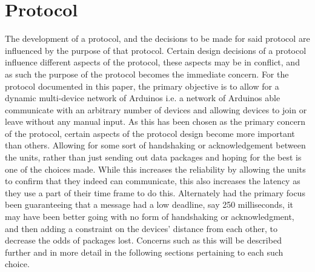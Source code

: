 \section{Protocol}
The development of a protocol, and the decisions to be made for said protocol are influenced by the purpose of that protocol.
Certain design decisions of a protocol influence different aspects of the protocol, these aspects may be in conflict, and as such the purpose of the protocol becomes the immediate concern.
For the protocol documented in this paper, the primary objective is to allow for a dynamic multi-device network of Arduinos i.e. a network of Arduinos able communicate with an arbitrary number of devices and allowing devices to join or leave without any manual input.
As this has been chosen as the primary concern of the protocol, certain aspects of the protocol design become more important than others.
Allowing for some sort of handshaking or acknowledgement between the units, rather than just sending out data packages and hoping for the best is one of the choices made.
While this increases the reliability by allowing the units to confirm that they indeed can communicate, this also increases the latency as they use a part of their time frame to do this.
Alternately had the primary focus been guaranteeing that a message had a low deadline, say 250 milliseconds, it may have been better going with no form of handshaking or acknowledgment, and then adding a constraint on the devices' distance from each other, to decrease the odds of packages lost.
Concerns such as this will be described further and in more detail in the following sections pertaining to each such choice.
